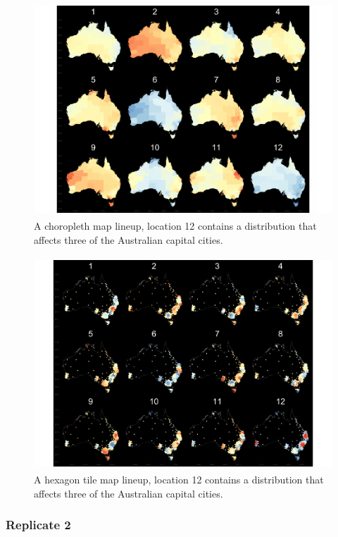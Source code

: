 \documentclass{monashthesis}
\begin{document}
\begin{figure}[H]
\centering
\includegraphics[height=8cm]{lineups/three-geo12-1.pdf}
\caption{\label{fig:three-geo12}A choropleth map lineup, location 12 contains a distribution that affects three of the Australian capital cities.}
\end{figure}

\begin{figure}[H]
\centering
\includegraphics[height=8cm]{lineups/three-hex12-1.pdf}
\caption{\label{fig:three-hex12}A hexagon tile map lineup, location 12 contains a distribution that affects three of the Australian capital cities.}
\end{figure}

\hypertarget{replicate-2-1}{%
\subsubsection{Replicate 2}\label{replicate-2-1}}
\end{document}
